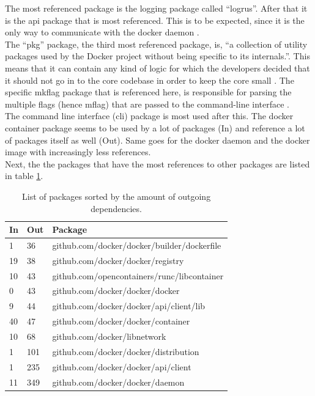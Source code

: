 The most referenced package is the logging package called ``logrus''. After that it is the api package that is most referenced. This is to be expected, since it is the only way to communicate with the docker daemon \cite{dockerapi}. \\
The ``pkg'' package, the third most referenced package, is, ``a collection of utility packages used by the Docker project without being specific to its internals.''. This means that it can contain any kind of logic for which the developers decided that it should not go in to the core codebase in order to keep the core small \cite{dockerpkg}. The specific mkflag package that is referenced here, is responsible for parsing the multiple flags (hence mflag) that are passed to the command-line interface \cite{dockermflag}. \\
The command line interface (cli) package is most used after this. The docker container package seems to be used by a lot of packages (In) and reference a lot of packages itself as well (Out). Same goes for the docker daemon and the docker image with increasingly less references. \\
Next, the the packages that have the most references to other packages are listed in table \ref{table:deptablehighestout}.

\begin{table}[H]
\caption{List of packages sorted by the amount of outgoing dependencies.}
\label{table:deptablehighestout}

\begin{tabular}{l l l}
\textbf{In} & \textbf{Out} & \textbf{Package} \\
\midrule
1 & 36 & github.com/docker/docker/builder/dockerfile \\
19 & 38 & github.com/docker/docker/registry \\
10 & 43 & github.com/opencontainers/runc/libcontainer \\
0 & 43 & github.com/docker/docker/docker \\
9 & 44 & github.com/docker/docker/api/client/lib \\
40 & 47 & github.com/docker/docker/container \\
10 & 68 & github.com/docker/libnetwork \\
1 & 101 & github.com/docker/docker/distribution \\
1 & 235 & github.com/docker/docker/api/client \\
11 & 349 & github.com/docker/docker/daemon \\
\end{tabular}
\end{table}

